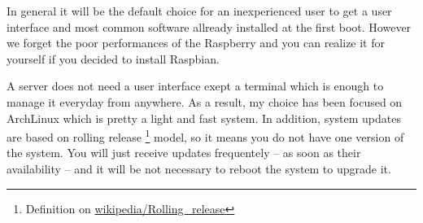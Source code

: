 In general it will be the default choice for an inexperienced user to get
a user interface and most common software allready installed at the first boot.
However we forget the poor performances of the Raspberry and you can realize 
it for yourself if you decided to install Raspbian. 

A server does not need a user interface exept a terminal which is enough 
to manage it everyday from anywhere. As a result, my choice has been focused 
on ArchLinux which is pretty a light and fast system. In addition, system 
updates are based on rolling release \footnote{Definition on \href{http://
en.wikipedia.org/wiki/Rolling\_release}{wikipedia/Rolling\_release}} model, 
so it means you do not have one version of the system. You will just receive 
updates frequentely -- as soon as their availability -- and it will be not 
necessary to reboot the system to upgrade it.
